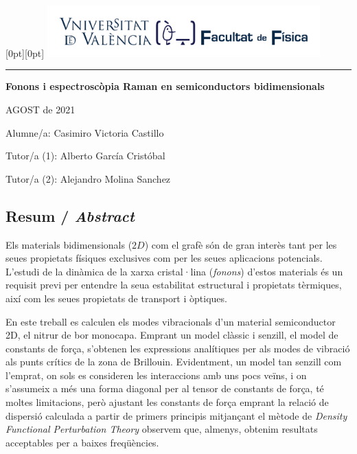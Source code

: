 \documentclass[12pt]{article} %
\author{Casimiro Victoria Castillo}
\begin{document}
\begin{titlepage}
   \noindent\raisebox{0pt}[0pt][0pt]{
	\includegraphics[width=10.5cm]{./portada-TFG-LaTeX/marca-Facultat-Fisica-UV-1-linia.pdf}}\par
   \vspace{8.5cm}
   {\centering
      \par
      \rule{16.13cm}{1.5pt}\par
      \vspace{4.5cm}
      {\bfseries\sffamily\LARGE Fonons i espectroscòpia Raman en semiconductors bidimensionals}\par
   }
   \vfill
   {\raggedleft\sffamily
		AGOST de 2021\par
      \vspace{\baselineskip}
		Alumne/a: Casimiro Victoria Castillo\par
      \vspace{\baselineskip}
		Tutor/a (1): Alberto García Cristóbal\par
		Tutor/a (2): Alejandro Molina Sanchez\par
   }
\end{titlepage}
\restoregeometry


\subsection*{Resum / \emph{Abstract}}
 
 Els materials bidimensionals ($2D$) com el grafè són de gran interès tant per les seues propietats físiques exclusives com per les seues aplicacions potencials. L'estudi de la dinàmica de la xarxa cristal·lina (\textit{fonons}) d'estos materials és un requisit previ per entendre la seua estabilitat estructural i propietats tèrmiques, així com les seues propietats de transport i òptiques. 
 
 En este treball es calculen els modes vibracionals  d'un  material semiconductor 2D, el nitrur de bor monocapa. Emprant un model clàssic i senzill, el model de constants de força, s'obtenen les expressions analítiques per als modes de vibració als punts crítics de la zona de Brillouin. Evidentment, un model tan senzill com l'emprat, on sols es consideren les interaccions amb uns pocs veïns, i on s'assumeix a més una forma diagonal per al tensor de constants de força, té moltes limitacions, però ajustant les constants de força emprant la relació de dispersió calculada a partir de primers principis mitjançant el mètode de \emph{Density Functional Perturbation Theory} observem que, almenys, obtenim resultats acceptables per a baixes freqüències.
\end{document}
